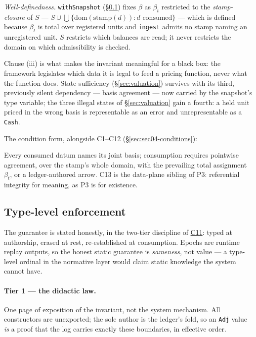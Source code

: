 \noindent
\emph{Well-definedness.} \texttt{withSnapshot} (\S\ref{sec:basis-types}) fixes $\beta$
as $\beta_t$ restricted to the \emph{stamp-closure} of $S$ ---
$S\cup\bigcup\{\mathrm{dom}(\mathrm{stamp}(d)) : d \text{ consumed}\}$ --- which is
defined because $\beta_t$ is total over registered units and \texttt{ingest} admits no
stamp naming an unregistered unit. $S$ restricts which balances are read; it never
restricts the domain on which admissibility is checked.

Clause (iii) is what makes the invariant meaningful for a black box: the framework
legislates which data it is legal to feed a pricing function, never what the function
does. State-sufficiency (\S\ref{sec:valuation}) survives with its third, previously
silent dependency --- basis agreement --- now carried by the snapshot's type variable;
the three illegal states of \S\ref{sec:valuation} gain a fourth: a held unit priced in
the wrong basis is representable as an error and unrepresentable as a \texttt{Cash}.

The condition form, alongside C1--C12 (\S\ref{sec:sec04-conditions}):

\begin{description}[style=nextline]
\item[C13 (basis edge).]\hypertarget{cond:C13}{}\label{cond:C13} Every consumed datum
names its joint basis; consumption requires pointwise agreement, over the stamp's whole
domain, with the prevailing total assignment $\beta_t$, or a ledger-authored arrow. C13
is the data-plane sibling of P3: referential integrity for meaning, as P3 is for
existence.
\end{description}

\subsection{Type-level enforcement}
\label{sec:basis-types}

The guarantee is stated honestly, in the two-tier discipline of
\hyperref[cond:C11]{C11}: typed at authorship, erased at rest, re-established at
consumption. Epochs are runtime replay outputs, so the honest static guarantee is
\emph{sameness}, not value --- a type-level ordinal in the normative layer would claim
static knowledge the system cannot have.

\paragraph{Tier 1 --- the didactic law.} One page of exposition of the invariant, not
the system mechanism. All constructors are unexported; the sole author is the ledger's
fold, so an \texttt{Adj} value \emph{is} a proof that the log carries exactly these
boundaries, in effective order.


